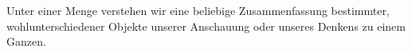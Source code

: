 \documentclass[../../main.tex]{subfiles}
\begin{document}
	\begin{definition}[Menge]
		\label{def:Menge}
		Unter einer Menge verstehen wir eine beliebige Zusammenfassung bestimmter, wohlunterschiedener Objekte unserer Anschauung oder unseres Denkens zu einem Ganzen.
	\end{definition}
\end{document}
